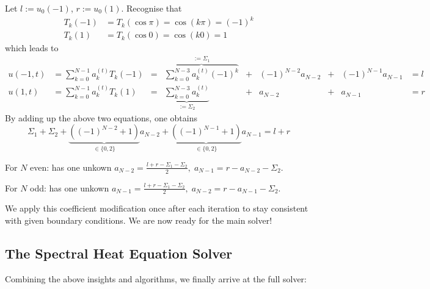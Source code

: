 \documentclass[12pt, a4paper]{article}
\begin{document}
  Let $l := u_0(-1)$, $r := u_0(1)$.
  Recognise that
  \begin{align*}
    T_k(-1) & = T_k(\cos \pi) = \cos(k \pi) = (-1)^k \\
    T_k(1)  & = T_k(\cos 0) = \cos(k 0) = 1
  \end{align*}
  which leads to
  \begin{align*}
    u(-1, t) & = \sum_{k=0}^{N-1} a_k^{(t)} T_k(-1) & = & \overbrace{\sum_{k=0}^{N-3} a_k^{(t)} (-1)^k}^{:= \Sigma_1} & + & (-1)^{N-2} a_{N-2} & + & (-1)^{N-1} a_{N-1} & = l \\
    u(1, t)  & = \sum_{k=0}^{N-1} a_k^{(t)} T_k(1)  & = & \underbrace{\sum_{k=0}^{N-3} a_k^{(t)}}_{:= \Sigma_2}       & + & a_{N-2}            & + & a_{N-1}            & = r
  \end{align*}
  By adding up the above two equations, one obtains
  \begin{equation}
    \Sigma_1 + \Sigma_2 + \underbrace{\left((-1)^{N-2} + 1\right)}_{\in \{0, 2\}} a_{N-2} + \underbrace{\left((-1)^{N-1} + 1\right)}_{\in \{0, 2\}} a_{N-1} = l + r \label{eq:boundary-equation}
  \end{equation}

  For $N$ even:  has one unkown $a_{N-2} = \frac{l+r-\Sigma_1-\Sigma_2}{2},\; a_{N-1} = r - a_{N-2} - \Sigma_2$.

  For $N$ odd:  has one unkown $a_{N-1} = \frac{l+r-\Sigma_1-\Sigma_2}{2},\; a_{N-2} = r - a_{N-1} - \Sigma_2$.

  We apply this coefficient modification once after each iteration to stay consistent with given boundary conditions.
  We are now ready for the main solver!

  \subsection{The Spectral Heat Equation Solver}
  Combining the above insights and algorithms, we finally arrive at the full solver:
\end{document}

